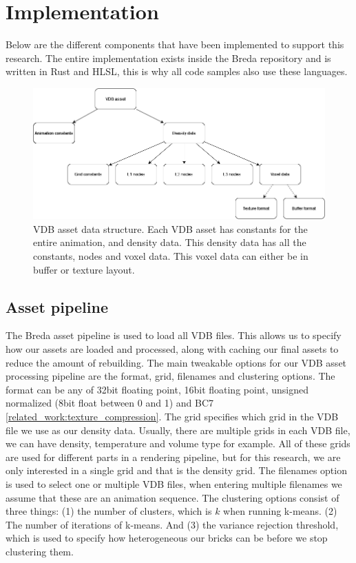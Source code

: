 \section{Implementation} \label{implementation}
Below are the different components that have been implemented to support this research. The entire implementation exists inside the Breda repository and is written in Rust and HLSL, this is why all code samples also use these languages.

\begin{figure}
    \centering
    \includegraphics[width=\linewidth]{figures/vdb_asset.png}
    \caption{VDB asset data structure. Each VDB asset has constants for the entire animation, and density data. This density data has all the constants, nodes and voxel data. This voxel data can either be in buffer or texture layout. }
    \label{fig:vdb_asset}
\end{figure}

\subsection{Asset pipeline} \label{implementation:asset_pipeline}
The Breda asset pipeline is used to load all VDB files. This allows us to specify how our assets are loaded and processed, along with caching our final assets to reduce the amount of rebuilding. The main tweakable options for our VDB asset processing pipeline are the format, grid, filenames and clustering options. The format can be any of 32bit floating point, 16bit floating point, unsigned normalized (8bit float between 0 and 1) and BC7 \ref{related_work:texture_compression}. The grid specifies which grid in the VDB file we use as our density data. Usually, there are multiple grids in each VDB file, we can have density, temperature and volume type for example. All of these grids are used for different parts in a rendering pipeline, but for this research, we are only interested in a single grid and that is the density grid. The filenames option is used to select one or multiple VDB files, when entering multiple filenames we assume that these are an animation sequence. The clustering options consist of three things: (1) the number of clusters, which is $k$ when running k-means. (2) The number of iterations of k-means. And (3) the variance rejection threshold, which is used to specify how heterogeneous our bricks can be before we stop clustering them.

